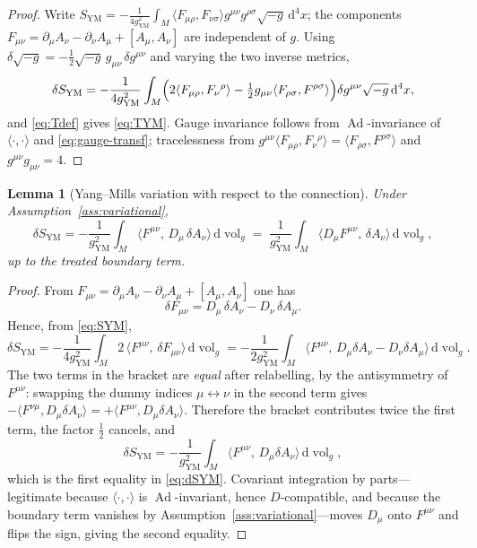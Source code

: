 \documentclass[11pt,a4paper]{article}
\theoremstyle{plain}
\newtheorem{lemma}[theorem]{Lemma}
\theoremstyle{definition}
\theoremstyle{remark}
\newcommand{\Ad}{\operatorname{Ad}}
\newcommand{\dvol}{\mathrm{d}\!\operatorname{vol}_g}
\begin{document}
\begin{proof}
Write $S_{\mathrm{YM}}=-\tfrac{1}{4g_{\mathrm{YM}}^2}\int_M
\langle F_{\mu\rho},F_{\nu\sigma}\rangle g^{\mu\nu}g^{\rho\sigma}\sqrt{-g}\,\mathrm{d}^4x$; the
components $F_{\mu\nu}=\partial_\mu A_\nu-\partial_\nu A_\mu+[A_\mu,A_\nu]$ are independent of $g$.
Using $\delta\sqrt{-g}=-\tfrac12\sqrt{-g}\,g_{\mu\nu}\,\delta g^{\mu\nu}$ and varying the two inverse
metrics,
\[
\delta S_{\mathrm{YM}}
=-\frac{1}{4g_{\mathrm{YM}}^2}\int_M
\Bigl(
2\langle F_{\mu\rho},F_{\nu}{}^{\rho}\rangle
-\tfrac12 g_{\mu\nu}\langle F_{\rho\sigma},F^{\rho\sigma}\rangle
\Bigr)\delta g^{\mu\nu}\sqrt{-g}\,\mathrm{d}^4x ,
\]
and \eqref{eq:Tdef} gives \eqref{eq:TYM}. Gauge invariance follows from $\Ad$-invariance of
$\langle\cdot,\cdot\rangle$ and \eqref{eq:gauge-transf}; tracelessness from
$g^{\mu\nu}\langle F_{\mu\rho},F_\nu{}^\rho\rangle=\langle F_{\rho\sigma},F^{\rho\sigma}\rangle$ and
$g^{\mu\nu}g_{\mu\nu}=4$.
\end{proof}

\begin{lemma}[Yang--Mills variation with respect to the connection]
\label{lem:YMvar}
Under Assumption~\ref{ass:variational},
\begin{equation}
\label{eq:dSYM}
\delta S_{\mathrm{YM}}
=-\frac{1}{g_{\mathrm{YM}}^{2}}\int_M
\bigl\langle F^{\mu\nu},\,D_\mu\,\delta A_\nu\bigr\rangle\,\dvol
=\;\frac{1}{g_{\mathrm{YM}}^{2}}\int_M
\bigl\langle D_\mu F^{\mu\nu},\,\delta A_\nu\bigr\rangle\,\dvol ,
\end{equation}
up to the treated boundary term.
\end{lemma}

\begin{proof}
From $F_{\mu\nu}=\partial_\mu A_\nu-\partial_\nu A_\mu+[A_\mu,A_\nu]$ one has
\begin{equation}
\label{eq:dF}
\delta F_{\mu\nu}=D_\mu\,\delta A_\nu - D_\nu\,\delta A_\mu .
\end{equation}
Hence, from \eqref{eq:SYM},
\[
\delta S_{\mathrm{YM}}
=-\frac{1}{4g_{\mathrm{YM}}^{2}}\int_M
2\,\bigl\langle F^{\mu\nu},\,\delta F_{\mu\nu}\bigr\rangle\,\dvol
=-\frac{1}{2g_{\mathrm{YM}}^{2}}\int_M
\bigl\langle F^{\mu\nu},\,D_\mu\delta A_\nu - D_\nu\delta A_\mu\bigr\rangle\,\dvol .
\]
The two terms in the bracket are \emph{equal} after relabelling, by the antisymmetry of $F^{\mu\nu}$:
swapping the dummy indices $\mu\leftrightarrow\nu$ in the second term gives
$-\langle F^{\nu\mu},D_\mu\delta A_\nu\rangle=+\langle F^{\mu\nu},D_\mu\delta A_\nu\rangle$.
Therefore the bracket contributes twice the first term, the factor $\tfrac12$ cancels, and
\[
\delta S_{\mathrm{YM}}
=-\frac{1}{g_{\mathrm{YM}}^{2}}\int_M
\bigl\langle F^{\mu\nu},\,D_\mu\delta A_\nu\bigr\rangle\,\dvol ,
\]
which is the first equality in \eqref{eq:dSYM}. Covariant integration by parts---legitimate
because
$\langle\cdot,\cdot\rangle$ is $\Ad$-invariant, hence $D$-compatible, and because the boundary term
vanishes by Assumption~\ref{ass:variational}---moves $D_\mu$ onto $F^{\mu\nu}$ and flips the sign,
giving the second equality.
\end{proof}
\end{document}
